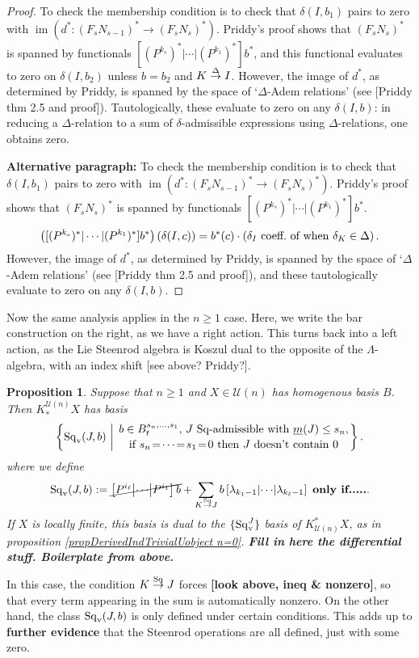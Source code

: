 \documentclass[11pt]{amsart}
\theoremstyle{plain}
\newtheorem{prop}[thm]{Proposition}
\theoremstyle{definition}
\DeclareMathOperator{\im}{im}
\renewcommand{\to}{\longrightarrow}
\newcommand{\calU}{\mathcal{U}}
\theoremstyle{plain}
\newcommand{\deltaalg}{\Delta} %
\newcommand{\minDimSq}{\underline{m}}
\newcommand{\produces}[3]{#3:#1\sim #2}
\renewcommand{\produces}[3]{#1\rightarrow_{#3} #2}%
\renewcommand{\produces}[3]{#1\overset{\smash{#3}}{\rightarrow} #2}%
\newcommand{\Sq}{\mathrm{Sq}}
\begin{document}
\begin{Koszul complexes}
\begin{proof}
To check the membership condition is to check that $\delta(I,b_1)$ pairs to zero with $\im(d^*:(F_sN_{s-1})^*\to(F_sN_s)^*)$. Priddy's proof shows that $(F_sN_s)^*$ is spanned by functionals $[(P^{k_s})^*|\cdots |(P^{k_1})^*]b^*$, and this functional evaluates to zero on $\delta(I,b_2)$ unless $b=b_2$ and $\produces{K}{I}{\deltaalg}$. However, the image of $d^*$, as determined by Priddy, is spanned by the space of `$\deltaalg$-Adem relations' (see [Priddy thm 2.5 and proof]). Tautologically, these evaluate to zero on any $\delta(I,b)$: in reducing a $\deltaalg$-relation to a sum of $\delta$-admissible expressions using $\deltaalg$-relations, one obtains zero.

\textbf{Alternative paragraph: }To check the membership condition is to check that $\delta(I,b_1)$ pairs to zero with $\im(d^*:(F_sN_{s-1})^*\to(F_sN_s)^*)$. Priddy's proof shows that $(F_sN_s)^*$ is spanned by functionals $[(P^{k_s})^*|\cdots |(P^{k_1})^*]b^*$. %
\[\left([(P^{k_s})^*|\cdots |(P^{k_1})^*]b^*\right)\left(\delta(I,c)\right)=b^*(c)\cdot\left(\textup{$\delta_I$ coeff.\ of when $\delta_K\in\deltaalg$}\right).\]
However, the image of $d^*$, as determined by Priddy, is spanned by the space of `$\deltaalg$-Adem relations' (see [Priddy thm 2.5 and proof]), and these tautologically evaluate to zero on any $\delta(I,b)$.
\end{proof}
Now the same analysis applies in the $n\geq1$ case. Here, we write the bar construction on the right, as we have a right action. This turns back into a left action, as the Lie Steenrod algebra is Koszul dual to the opposite of the $\Lambda$-algebra, with an index shift [see above? Priddy?].
\begin{prop}\label{propDerivedIndTrivialUobject n at least 1}
Suppose that $n\geq1$ and $X\in\calU(n)$ has homogenous basis $B$. Then $K_*^{\calU(n)}X$ has basis
\[\left\{\Sq_{\textup{v}}(J,b)\ \middle|\ \genfrac{}{}{0pt}{}{b\in B^{s_{n},\ldots,s_1}_t\textup{, $J$ $\Sq$-admissible with }\minDimSq(J)\leq s_n,}{\textup{if }s_{n}\!=\!\cdots\!=\!s_1\!=\!0\textup{ then $J$ doesn't contain 0}}\right\}.\]
where we define
\[\Sq_\textup{v}(J,b):=\cancel{\left[P^{i_\ell}\middle|\cdots\middle|P^{i_1} \right]b}+\sum_{\produces{K}{J}{\Sq}}b\left[\lambda_{k_1-1} \middle|\cdots\middle|\lambda_{k_\ell-1} \right]\textup{ \textbf{only if.....}}.\]
If $X$ is locally finite, this basis is dual to the $\{\Sq_\textup{v}^J\}$ basis of $K^*_{\calU(n)}X$, as in proposition \ref{propDerivedIndTrivialUobject n=0}. \textbf{Fill in here the differential stuff. Boilerplate from above.}
\end{prop}
In this case, the condition $\produces{K}{J}{\Sq}$ forces \textbf{[look above, ineq \& nonzero]}, so that every term appearing in the sum is automatically nonzero. On the other hand, the class $\Sq_\textup{v}(J,b)$ is only defined under certain conditions. This adds up to \textbf{further evidence} that the Steenrod operations are all defined, just with some zero.

\end{Koszul complexes}
\end{document}
